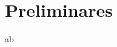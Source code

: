 \documentclass[12pt, a4paper, leqno]{book}
\begin{document}
\chapter{Preliminares}

ab
\end{document}
